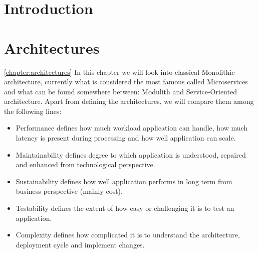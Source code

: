 \chapter*{Introduction}


\setcounter{page}{1}

\begin{chapterabstract}
    \lipsum[1]
\end{chapterabstract}

\lipsum[1]

\chapter{Architectures}
\ref{chapter:architectures}
In this chapter we will look into classical Monolithic architecture, currently what is considered the most famous called Microservices and what can be found somewhere between: Modulith and Service-Oriented architecture. Apart from defining the architectures, we will compare them among the following lines:
\begin{itemize}
    \item Performance defines how much workload application can handle, how much latency is present during processing and how well application can scale.
    \item Maintainability defines degree to which application is understood, repaired and enhanced from technological perspective.  \cite{SOFTWARE_MAINTAINABILITY}
    \item Sustainability defines how well application performs in long term from business perspective (mainly cost).
    \item Testability defines the extent of how easy or challenging it is to test an application.
    \item Complexity defines how complicated it is to understand the architecture, deployment cycle and implement changes.
\end{itemize}

